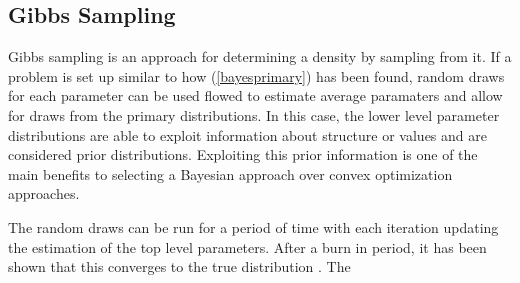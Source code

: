 \documentclass{IEEEtran}
\begin{document}
\subsection{Gibbs Sampling}

Gibbs sampling is an approach for determining a density by sampling
from it.  If a problem is set up similar to how (\ref{bayesprimary})
has been found, random draws for each parameter can be used
flowed to estimate average paramaters and allow for draws from the primary distributions.  In this
case, the lower level parameter distributions are able to exploit information
about structure or values and are considered prior distributions.
Exploiting this prior information is one of the main benefits to selecting a Bayesian approach over
convex optimization approaches.  

The random draws can be run for a period of time with each iteration
updating the estimation of the top level parameters. After a burn in
period, it has been shown that this
converges to the true distribution \cite{Mackay03}.  The 



\end{document}
